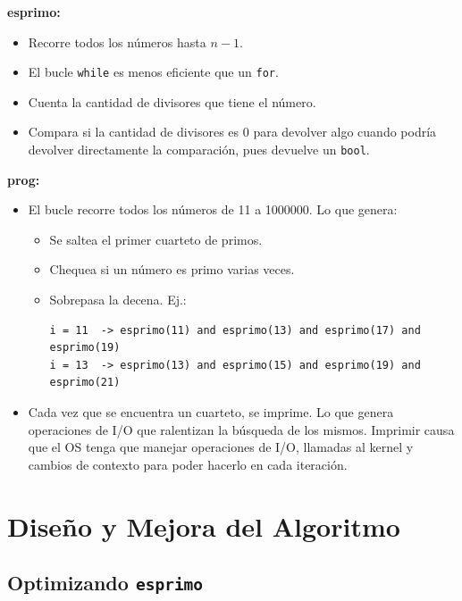 \documentclass[12pt,a4paper]{article}
\begin{document}
\textbf{esprimo:}
\begin{itemize}
  \item Recorre todos los números hasta $n-1$.
  \item El bucle \texttt{while} es menos eficiente que un \texttt{for}.
  \item Cuenta la cantidad de divisores que tiene el número.
  \item Compara si la cantidad de divisores es 0 para devolver algo cuando podría devolver directamente la comparación, pues devuelve un \texttt{bool}.
\end{itemize}

\textbf{prog:}
\begin{itemize}
  \item El bucle recorre todos los números de 11 a 1000000. Lo que genera:
  \begin{itemize}
    \item Se saltea el primer cuarteto de primos.
    \item Chequea si un número es primo varias veces.
    \item Sobrepasa la decena. Ej.:
    \begin{verbatim}
i = 11  -> esprimo(11) and esprimo(13) and esprimo(17) and esprimo(19)
i = 13  -> esprimo(13) and esprimo(15) and esprimo(19) and esprimo(21)
    \end{verbatim}
  \end{itemize}
  \item Cada vez que se encuentra un cuarteto, se imprime. Lo que genera operaciones de I/O que ralentizan la búsqueda de los mismos. Imprimir causa que el OS tenga que manejar operaciones de I/O, llamadas al kernel y cambios de contexto para poder hacerlo en cada iteración.
\end{itemize}

\section{Diseño y Mejora del Algoritmo}

\subsection{Optimizando \texttt{esprimo}}
\end{document}
